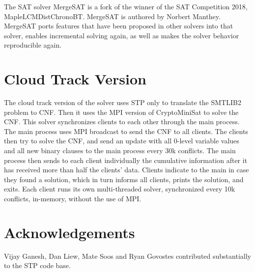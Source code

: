 \documentclass{easychair}
\begin{document}
The SAT solver MergeSAT is a fork of the winner of the SAT Competition 2018, MapleLCMDistChronoBT. MergeSAT is authored by Norbert Manthey. 
MergeSAT ports features that have been proposed in other solvers into that solver, enables incremental solving again, as well as makes the solver behavior reproducible again.

\section{Cloud Track Version}
The cloud track version of the solver uses STP only to translate the SMTLIB2 problem to CNF. Then it uses the MPI version of CryptoMiniSat to solve the CNF. This solver synchronizes clients to each other through the main process. The main process uses MPI broadcast to send the CNF to all clients. The clients then try to solve the CNF, and send an update with all 0-level variable values and all new binary clauses to the main process every 30k conflicts. The main process then sends to each client individually the cumulative information after it has received more than half the clients' data. Clients indicate to the main in case they found a solution, which in turn informs all clients, prints the solution, and exits. Each client runs its own multi-threaded solver, synchronized every 10k conflicts, in-memory, without the use of MPI.

\section*{Acknowledgements}
Vijay Ganesh, Dan Liew, Mate Soos and Ryan Govostes contributed substantially to the STP code base.




\vfill
\pagebreak
\end{document}
